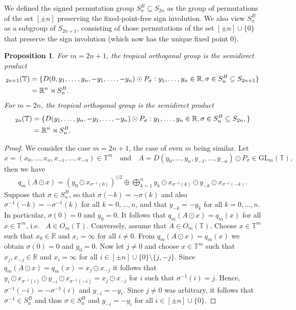\documentclass[10pt, a4paper]{amsart}
\newtheorem{proposition}[theorem]{Proposition}
\theoremstyle{definition}
\theoremstyle{myitemstyle}
\newcommand{\R}{\mathbb{R}}
\newcommand{\RR}{\mathbb{R}}
\newcommand{\TT}{\mathbb{T}}
\newcommand{\T}{\mathbb{T}}
\newcommand{\GL}{{\mathrm{GL}}}
\let\O\relax
\DeclareMathOperator{\O}{O}
\begin{document}
We defined the signed permutation group $S_n^B\subseteq S_{2n}$ as the group of permutations of the set $[\pm n]$ preserving the fixed-point-free sign involution. We also view $S_n^B$ as a subgroup of $S_{2n+1}$, consisting of those permutations of the set $[\pm n]\cup \{0\}$ that preserve the sign involution (which now has the unique fixed point $0$). 



\begin{proposition}  For $m=2n+1$, the tropical orthogonal group is the semidirect product
        \[\begin{split}
        \O_{2n+1}(\TT)&=\{ D(0,y_1,\ldots,y_n,-y_1,\ldots,-y_n)\odot P_{\sigma}:y_1,\ldots,y_n \in \RR,\sigma \in S_n^B\subseteq S_{2n+1}\}\\
        &=\R^n\rtimes S_n^B.
        \end{split}
        \]
For $m=2n$, the tropical orthogonal group is the semidirect product
        \[\begin{split}
        \O_{2n}(\TT)&=\{D(y_1,\ldots,y_n,-y_1,\ldots,-y_n)\odot P_{\sigma}:y_1,\ldots,y_n \in \RR, \sigma \in S_n^B\subseteq S_{2n},\}\\
        &=\R^n\rtimes S_n^B.
        \end{split}
        \]
\end{proposition}


\begin{proof}
    We consider the case $m=2n+1$, the case of even $m$ being similar. Let
\[
x=(x_0,\ldots,x_n,x_{-1},\ldots,x_{-n})\in \TT^m\quad\text{and}\quad A= D(y_0,\ldots,y_n,y_{-1},\ldots,y_{-n}) \odot P_{\sigma}  \in \GL_{m}(\T),
\]
then we have
    \begin{align*}
        q_m(A \odot x) = (y_{0} \odot 
        x_{\sigma^{-1}(0)})^{\odot 2} \oplus \bigoplus_{k=1}^{n} 
        y_{k} \odot x_{\sigma^{-1}(k)} \odot
        y_{-k} \odot x_{\sigma^{-1}(-k)}.
    \end{align*}
    Suppose that $\sigma \in S_n^B$, so that $\sigma(-k) =  -  \sigma(k)$ and also $\sigma^{-1}(-k) =  -  \sigma^{-1}(k)$ for all $k=0,\ldots,n$, and that $y_{-k}=-y_k$ for all $k=0,\ldots,n$. In particular, $\sigma(0) = 0$ and $y_{0} = 0$. It follows that $q_m(A \odot x) = q_m(x)$ for all $x \in \T^m$, i.e.~  $A \in O_{m}(\T)$. 
    Conversely, assume that $A \in O_{m}(\T)$. Choose $x \in \T^m$ such that $x_{0} \in \R$ and $x_i = \infty $ for all $i \neq 0$. From $q_m(A \odot x) = q_m(x)$ we obtain $\sigma(0) = 0$ and $y_{0} = 0$. Now let $j \neq 0$ and choose $x \in \T^m$ such that $x_j, x_{-j} \in \R$ and $x_i = \infty $ for all $i \in [\pm n] \cup \{0\} \setminus \{j, -j\}$. Since $q_m(A \odot x) = q_m(x) = x_j \odot x_{-j}$  it follows that $y_{i} \odot x_{\sigma^{-1}(i)} \odot y_{-i} \odot x_{\sigma^{-1}(-i)} = x_j \odot x_{-j}$ for $i$ such that $\sigma^{-1}(i) = j$. Hence, $\sigma^{-1}(-i) = - \sigma^{-1}(i)$ and $y_{-i}  = - y_{i}.$ Since $j \neq 0$ was arbitrary, it follows that $\sigma^{-1} \in S_n^B$ and thus $\sigma \in S_n^B$ and $y_{-i} = -y_{i}$ for all $i \in [\pm n] \cup \{0\}$.
\end{proof}    
\end{document}
